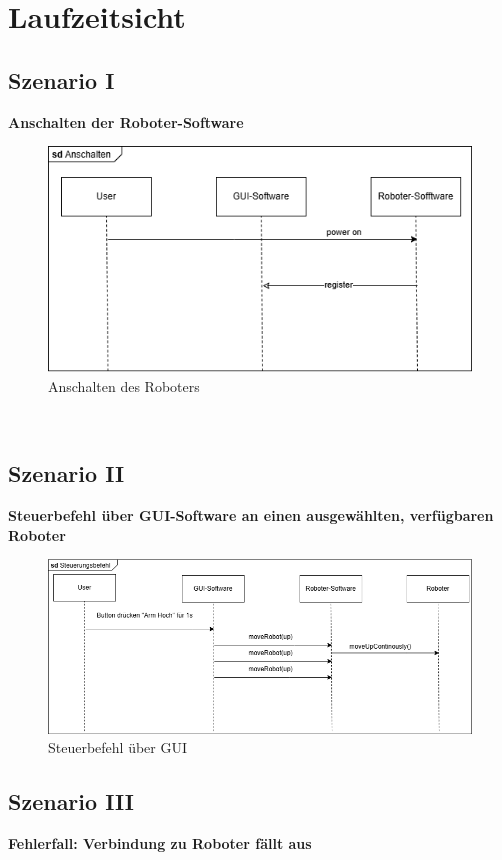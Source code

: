 \chapter{Laufzeitsicht}

\section{Szenario I}
\textbf{Anschalten der Roboter-Software}\\

\begin{figure}[h]
    \centering
    \includegraphics[width=0.8\linewidth]{diagrams/Anschalten.png}
    \caption{Anschalten des Roboters}
    \label{fig:Anschalten}
\end{figure}
\\
\clearpage
\section{Szenario II}
\textbf{Steuerbefehl über GUI-Software an einen ausgewählten, verfügbaren Roboter}\\

\begin{figure}[h]  
    \centering
    \includegraphics[width=0.8\linewidth]{diagrams/Steuerungsbefehl.png}
    \caption{Steuerbefehl über GUI}
    \label{fig:Steuerbefehl}
\end{figure}

\clearpage
\section{Szenario III}
\textbf{Fehlerfall: Verbindung zu Roboter fällt aus}\\

